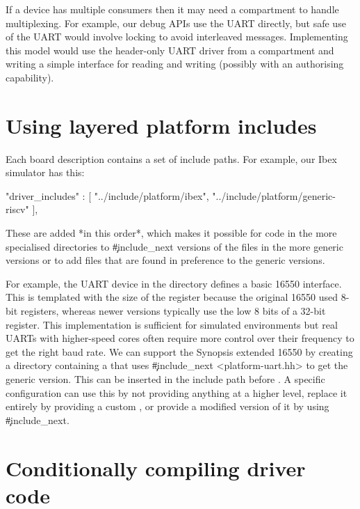 If a device has multiple consumers then it may need a compartment to handle multiplexing.
For example, our debug APIs use the UART directly, but safe use of the UART would involve locking to avoid interleaved messages.
Implementing this model would use the header-only UART driver from a compartment and writing a simple interface for reading and writing (possibly with an authorising capability).

\section{Using layered platform includes}

Each board description contains a set of include paths.
For example, our Ibex simulator has this:

\begin{jsonsnippet}
    "driver_includes" : [
        "../include/platform/ibex",
        "../include/platform/generic-riscv"
    ],
\end{jsonsnippet}

These are added *in this order*, which makes it possible for code in the more specialised directories to \c{#include_next} versions of the files in the more generic versions or to add files that are found in preference to the generic versions.

For example, the UART device in the  directory defines a basic 16550 interface.
This is templated with the size of the register because the original 16550 used 8-bit registers, whereas newer versions typically use the low 8 bits of a 32-bit register.
This implementation is sufficient for simulated environments but real UARTs with higher-speed cores often require more control over their frequency to get the right baud rate.
We can support the Synopsis extended 16550 by creating a  directory containing a  that uses \c{#include_next <platform-uart.hh>} to get the generic version.
This can be inserted in the include path before .
A specific configuration can use this by not providing anything at a higher level, replace it entirely by providing a custom , or provide a modified version of it by using \c{#include_next}.

\section{Conditionally compiling driver code}

